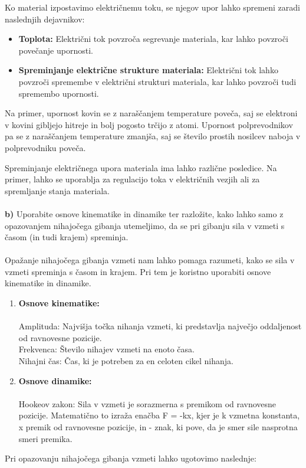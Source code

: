 \documentclass{report}
\begin{document}
\noindent Ko material izpostavimo električnemu toku, se njegov upor lahko spremeni zaradi naslednjih dejavnikov:

\begin{itemize}
    \item \textbf{Toplota:} Električni tok povzroča segrevanje materiala, kar lahko povzroči povečanje upornosti.
    \item \textbf{Spreminjanje električne strukture materiala:} Električni tok lahko povzroči spremembe v električni strukturi materiala, kar lahko povzroči tudi spremembo upornosti.
\end{itemize}

\noindent Na primer, upornost kovin se z naraščanjem temperature poveča, saj se elektroni v kovini gibljejo hitreje in bolj pogosto trčijo z atomi. Upornost polprevodnikov pa se z naraščanjem temperature zmanjša, saj se število prostih nosilcev naboja v polprevodniku poveča.

\noindent Spreminjanje električnega upora materiala ima lahko različne posledice. Na primer, lahko se uporablja za regulacijo toka v električnih vezjih ali za spremljanje stanja materiala.
\\\\
\newpage
\noindent \textbf{b)} Uporabite osnove kinematike in dinamike ter razložite, kako lahko samo z
opazovanjem nihajočega gibanja utemeljimo, da se pri gibanju sila v vzmeti s časom (in
tudi krajem) spreminja.\\\\
Opažanje nihajočega gibanja vzmeti nam lahko pomaga razumeti, kako se sila v vzmeti spreminja s časom in krajem. Pri tem je koristno uporabiti osnove kinematike in dinamike.

  \begin{enumerate}
    \item \textbf{Osnove kinematike:}\\\\
        Amplituda: Najvišja točka nihanja vzmeti, ki predstavlja največjo oddaljenost od ravnovesne pozicije.\\
        Frekvenca: Število nihajev vzmeti na enoto časa.\\
        Nihajni čas: Čas, ki je potreben za en celoten cikel nihanja.

    \item \textbf{Osnove dinamike:}\\\\
        Hookeov zakon: Sila v vzmeti je sorazmerna s premikom od ravnovesne pozicije. Matematično to izraža enačba F = -kx, kjer je k vzmetna konstanta, x premik od ravnovesne pozicije, in - znak, ki pove, da je smer sile nasprotna smeri premika.
  \end{enumerate}
Pri opazovanju nihajočega gibanja vzmeti lahko ugotovimo naslednje:
\end{document}
